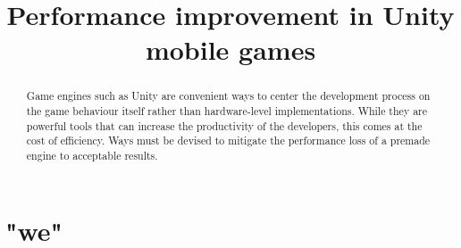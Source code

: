 \documentclass[sigconf]{acmart}
\begin{document}
\title[Unity Mobile Games]{Performance improvement in Unity mobile games}
\begin{abstract}
Game engines such as Unity are convenient ways to center the development process on the game behaviour itself rather than hardware-level implementations. While they are powerful tools that can increase the productivity of the developers, this comes at the cost of efficiency. Ways must be devised to mitigate the performance loss of a premade engine to acceptable results.
\end{abstract}
\maketitle
\section{"we"}

\balance

%
\end{document}
